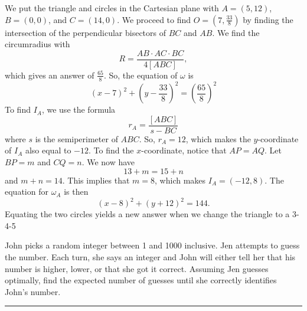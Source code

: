 \documentclass[11pt]{scrartcl}
\begin{document}
We put the triangle and circles in the Cartesian plane with $A = (5, 12)$, $B = (0, 0)$, and $C = (14, 0)$. We proceed to find $O = \left(7, \frac{33}{8}\right)$ by finding the intersection of the perpendicular bisectors of $BC$ and $AB$. We find the circumradius with
\[R = \frac{AB \cdot AC \cdot BC}{4[ABC]},\]
which gives an answer of $\frac{65}{8}$. So, the equation of $\omega$ is
\[(x - 7)^{2} + (y - \frac{33}{8})^{2} = \left(\frac{65}{8}\right)^{2}\]
To find $I_{A}$, we use the formula
\[r_{A} = \frac{[ABC]}{s - BC}\]
where $s$ is the semiperimeter of $ABC$. So, $r_{A} = 12$, which makes the $y$-coordinate of $I_{A}$ also equal to $-12$. To find the $x$-coordinate, notice that $AP = AQ$. Let $BP = m$ and $CQ = n$. We now have
\[13 + m = 15 + n\]
and $m + n = 14$. This implies that $m = 8$, which makes $I_{A} = (-12,8)$. The equation for $\omega_{A}$ is then
\[(x - 8)^{2} + (y + 12)^{2} = 144.\]
Equating the two circles yields a new answer when we change the triangle to a 3-4-5


\pagebreak

\begin{problem}
    John picks a random integer between 1 and 1000 inclusive. Jen attempts to guess the number. Each turn, she says an integer and John will either tell her that his number is higher, lower, or that she got it correct. Assuming Jen guesses optimally, find the expected number of guesses until she correctly identifies John's number.
\end{problem}

\vspace{-\baselineskip}\rule{\textwidth}{0.4pt}

\pagebreak
\end{document}
